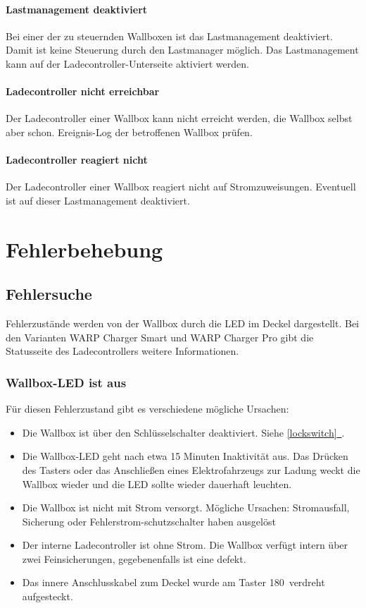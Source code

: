 \documentclass[a4paper,10pt]{article}
\newcommand*{\fullref}[1]{\hyperref[{#1}]{\ref*{#1}~\nameref*{#1}}}
\begin{document}
\begin{multicols*}{2}
	\paragraph{Lastmanagement deaktiviert}
	Bei einer der zu steuernden Wallboxen ist das Lastmanagement deaktiviert. Damit ist keine Steuerung durch den Lastmanager möglich. Das Lastmanagement kann auf der Ladecontroller-Unterseite aktiviert werden.

	\paragraph{Ladecontroller nicht erreichbar}
	Der Ladecontroller einer Wallbox kann nicht erreicht werden, die Wallbox selbst aber schon. Ereignis-Log der betroffenen Wallbox prüfen.

	\paragraph{Ladecontroller reagiert nicht}
	Der Ladecontroller einer Wallbox reagiert nicht auf Stromzuweisungen. Eventuell ist auf dieser Lastmanagement deaktiviert.

	\newpage \section{Fehlerbehebung}\label{fehlerbehebung} \subsection{Fehlersuche}
	Fehlerzustände werden von der Wallbox durch die LED im Deckel
	dargestellt. Bei den Varianten WARP Charger Smart und WARP Charger Pro gibt die Statusseite des Ladecontrollers
	weitere Informationen.

	\subsubsection*{Wallbox-LED ist aus}
	Für diesen Fehlerzustand gibt es verschiedene mögliche Ursachen:
	\begin{itemize}
		\item Die Wallbox ist über den Schlüsselschalter deaktiviert. Siehe \fullref{lockswitch}.
		\item Die Wallbox-LED geht nach etwa 15 Minuten Inaktivität aus. Das Drücken des Tasters
		      oder das Anschließen eines Elektrofahrzeugs zur Ladung weckt die Wallbox wieder
		      und die LED sollte wieder dauerhaft leuchten.
		\item Die Wallbox ist nicht mit Strom versorgt. Mögliche Ursachen: Stromausfall,
		      Sicherung oder Fehlerstrom-schutzschalter haben ausgelöst
		\item Der interne Ladecontroller ist ohne Strom. Die Wallbox verfügt intern über zwei
		      Feinsicherungen, gegebenenfalls ist eine defekt.
		\item Das innere Anschlusskabel zum Deckel wurde am Taster 180\textdegree\ verdreht aufgesteckt.
	\end{itemize}


\end{multicols*}
\end{document}
